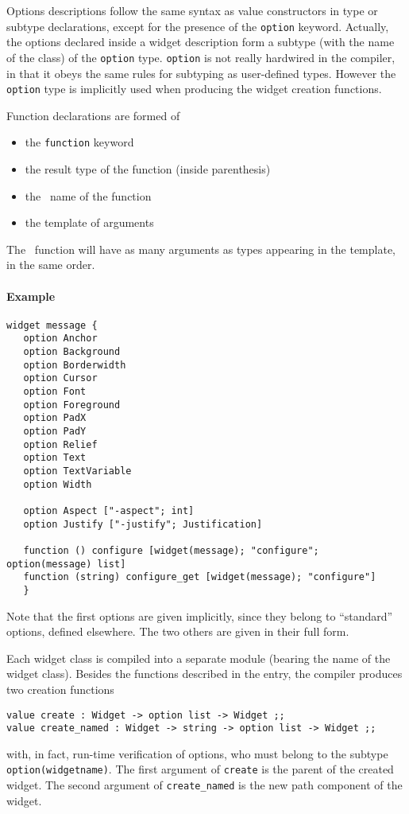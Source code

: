 Options descriptions follow the same syntax as value constructors in type or
subtype declarations, except for the presence of the \verb|option| keyword.
Actually, the options declared inside a widget description form a subtype
(with the name of the class) of the \verb|option| type. 
\verb|option| is not really hardwired in the compiler, in that it obeys the
same rules for subtyping as user-defined types. However the \verb|option|
type is implicitly used when producing the widget creation functions.

Function declarations are formed of
\begin{itemize}
\item the \verb|function| keyword
\item the result type of the function (inside parenthesis)
\item the \caml\ name of the function
\item the template of arguments
\end{itemize} 

The \caml\ function will have as many arguments as types appearing in the
template, in the same order.

\paragraph{Example}
\begin{verbatim}
widget message {
   option Anchor
   option Background
   option Borderwidth
   option Cursor
   option Font
   option Foreground
   option PadX
   option PadY
   option Relief
   option Text
   option TextVariable
   option Width

   option Aspect ["-aspect"; int]
   option Justify ["-justify"; Justification]

   function () configure [widget(message); "configure"; option(message) list]
   function (string) configure_get [widget(message); "configure"]
   }
\end{verbatim}
Note that the first options are given implicitly, since they belong to
``standard'' options, defined elsewhere. The two others are given in their
full form. 

Each widget class is compiled into a separate module (bearing the name of the
widget class). Besides the functions described in the entry, the compiler
produces two creation functions
\begin{verbatim}
value create : Widget -> option list -> Widget ;;
value create_named : Widget -> string -> option list -> Widget ;;
\end{verbatim} 
with, in fact, run-time verification of options, who must belong to the
subtype \verb|option(widgetname)|. The first argument of \verb|create| is
the parent of the created widget. The second argument of \verb|create_named|
is the new path component of the widget.


